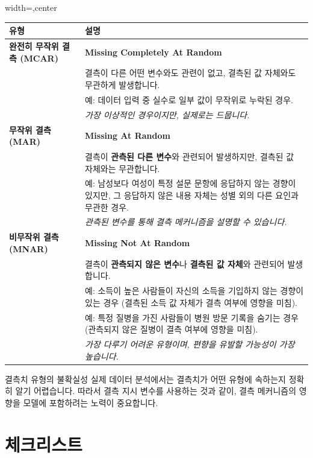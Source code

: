 \documentclass[11pt,a4paper]{article}
\begin{document}
\begin{adjustbox}{width=\textwidth,center}
\begin{tabular}{p{} p{}}
\toprule
\textbf{유형} & \textbf{설명} \\
\midrule
\textbf{완전히 무작위 결측 (MCAR)} & \textbf{Missing Completely At Random} \\
& 결측이 다른 어떤 변수와도 관련이 없고, 결측된 값 자체와도 무관하게 발생합니다. \\
& 예: 데이터 입력 중 실수로 일부 값이 무작위로 누락된 경우. \\
& \textit{가장 이상적인 경우이지만, 실제로는 드뭅니다.} \\
\midrule
\textbf{무작위 결측 (MAR)} & \textbf{Missing At Random} \\
& 결측이 \textbf{관측된 다른 변수}와 관련되어 발생하지만, 결측된 값 자체와는 무관합니다. \\
& 예: 남성보다 여성이 특정 설문 문항에 응답하지 않는 경향이 있지만, 그 응답하지 않은 내용 자체는 성별 외의 다른 요인과 무관한 경우. \\
& \textit{관측된 변수를 통해 결측 메커니즘을 설명할 수 있습니다.} \\
\midrule
\textbf{비무작위 결측 (MNAR)} & \textbf{Missing Not At Random} \\
& 결측이 \textbf{관측되지 않은 변수}나 \textbf{결측된 값 자체}와 관련되어 발생합니다. \\
& 예: 소득이 높은 사람들이 자신의 소득을 기입하지 않는 경향이 있는 경우 (결측된 소득 값 자체가 결측 여부에 영향을 미침). \\
& 예: 특정 질병을 가진 사람들이 병원 방문 기록을 숨기는 경우 (관측되지 않은 질병이 결측 여부에 영향을 미침). \\
& \textit{가장 다루기 어려운 유형이며, 편향을 유발할 가능성이 가장 높습니다.} \\
\bottomrule
\end{tabular}
\end{adjustbox}

\begin{warningbox}{결측치 유형의 불확실성}
실제 데이터 분석에서는 결측치가 어떤 유형에 속하는지 정확히 알기 어렵습니다. 따라서 결측 지시 변수를 사용하는 것과 같이, 결측 메커니즘의 영향을 모델에 포함하려는 노력이 중요합니다.
\end{warningbox}

\newpage
\section*{체크리스트}
\end{document}
